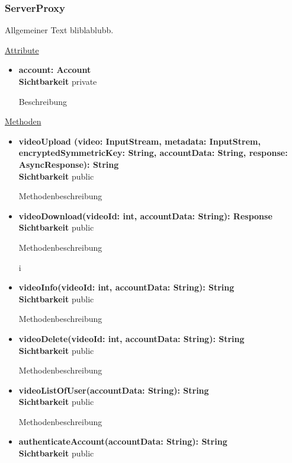\subsubsection{ServerProxy} \label{service:klasse:ServerProxy}
Allgemeiner Text bliblablubb. \newline

\underline{Attribute}
\begin{itemize}
\itemsep0pt
\item \textbf{account: Account} \hfill\\ 
\textbf{Sichtbarkeit} private

Beschreibung

\end{itemize}

\underline{Methoden}
\begin{itemize}
\itemsep0pt
\item \textbf{videoUpload (video: InputStream, metadata: InputStrem, encryptedSymmetricKey: String, accountData: String, response: AsyncResponse): String}\hfill\\
\textbf{Sichtbarkeit} public

Methodenbeschreibung

\item \textbf{videoDownload(videoId: int, accountData: String): Response}\hfill\\
\textbf{Sichtbarkeit} public

Methodenbeschreibung

i\item \textbf{videoInfo(videoId: int, accountData: String): String}\hfill\\
\textbf{Sichtbarkeit} public

Methodenbeschreibung

\item \textbf{videoDelete(videoId: int, accountData: String): String}\hfill\\
\textbf{Sichtbarkeit} public

Methodenbeschreibung

\item \textbf{videoListOfUser(accountData: String): String}\hfill\\
\textbf{Sichtbarkeit} public  

Methodenbeschreibung

\item \textbf{authenticateAccount(accountData: String): String}\hfill\\
\textbf{Sichtbarkeit} public


\end{itemize}
